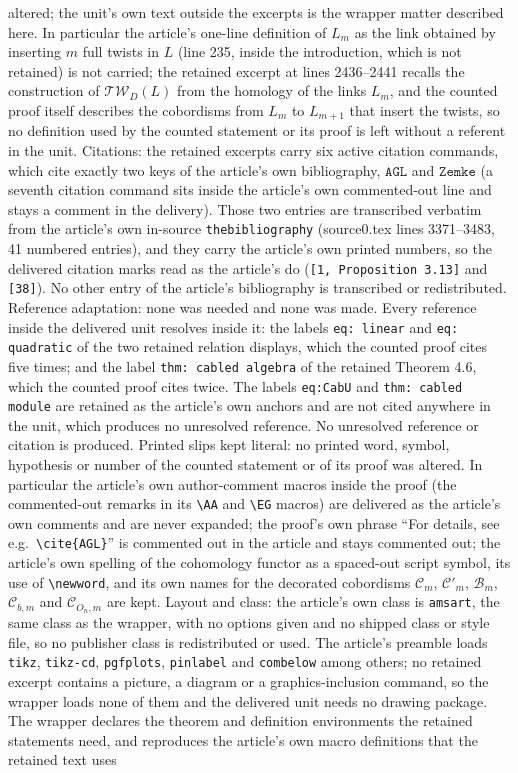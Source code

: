 \documentclass[10pt,a4paper]{amsart}
\theoremstyle{plain}
\newcommand{\Tw}{\mathcal{TW}}
\begin{document}
altered; the unit's own text outside the excerpts is the wrapper matter described here. In particular the article's one-line definition of $L_m$ as the link obtained by inserting $m$ full twists in $L$ (line 235, inside the introduction, which is not retained) is not carried; the retained excerpt at lines 2436--2441 recalls the construction of $\Tw_D(L)$ from the homology of the links $L_m$, and the counted proof itself describes the cobordisms from $L_m$ to $L_{m+1}$ that insert the twists, so no definition used by the counted statement or its proof is left without a referent in the unit. Citations: the retained excerpts carry six active citation commands, which cite exactly two keys of the article's own bibliography, $\mathtt{AGL}$ and $\mathtt{Zemke}$ (a seventh citation command sits inside the article's own commented-out line and stays a comment in the delivery). Those two entries are transcribed verbatim from the article's own in-source \texttt{thebibliography} (source0.tex lines 3371--3483, 41 numbered entries), and they carry the article's own printed numbers, so the delivered citation marks read as the article's do (\texttt{[1, Proposition 3.13]} and \texttt{[38]}). No other entry of the article's bibliography is transcribed or redistributed. Reference adaptation: none was needed and none was made. Every reference inside the delivered unit resolves inside it: the labels \texttt{eq: linear} and \texttt{eq: quadratic} of the two retained relation displays, which the counted proof cites five times; and the label \texttt{thm: cabled algebra} of the retained Theorem 4.6, which the counted proof cites twice. The labels \texttt{eq:CabU} and \texttt{thm: cabled module} are retained as the article's own anchors and are not cited anywhere in the unit, which produces no unresolved reference. No unresolved reference or citation is produced. Printed slips kept literal: no printed word, symbol, hypothesis or number of the counted statement or of its proof was altered. In particular the article's own author-comment macros inside the proof (the commented-out remarks in its \texttt{\textbackslash AA} and \texttt{\textbackslash EG} macros) are delivered as the article's own comments and are never expanded; the proof's own phrase ``For details, see e.g.\ \texttt{\textbackslash cite\{AGL\}}'' is commented out in the article and stays commented out; the article's own spelling of the cohomology functor as a spaced-out script symbol, its use of \texttt{\textbackslash newword}, and its own names for the decorated cobordisms $\mathcal{C}_m$, $\mathcal{C}'_m$, $\mathcal{B}_m$, $\mathcal{C}_{b,m}$ and $\mathcal{C}_{O_n,m}$ are kept. Layout and class: the article's own class is \texttt{amsart}, the same class as the wrapper, with no options given and no shipped class or style file, so no publisher class is redistributed or used. The article's preamble loads \texttt{tikz}, \texttt{tikz-cd}, \texttt{pgfplots}, \texttt{pinlabel} and \texttt{combelow} among others; no retained excerpt contains a picture, a diagram or a graphics-inclusion command, so the wrapper loads none of them and the delivered unit needs no drawing package. The wrapper declares the theorem and definition environments the retained statements need, and reproduces the article's own macro definitions that the retained text uses 
\end{document}
